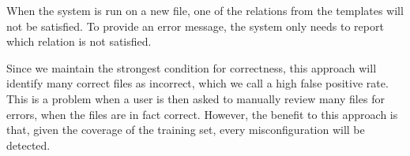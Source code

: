 When the system is run on a new file, one of the relations from the templates will not be satisfied.
To provide an error message, the system only needs to report which relation is not satisfied.

Since we maintain the strongest condition for correctness, this approach will identify many correct files as incorrect, which we call a high false positive rate.
This is a problem when a user is then asked to manually review many files for errors, when the files are in fact correct.
However, the benefit to this approach is that, given the coverage of the training set, every misconfiguration will be detected.


